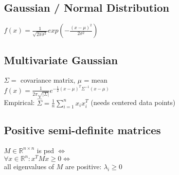 \subsection*{Gaussian / Normal Distribution}
$f(x) = \frac{1}{\sqrt{2\pi\sigma^2}} exp(-\frac{(x-\mu)^2}{2\sigma^2})$

\subsection*{Multivariate Gaussian}
$\Sigma =$ covariance matrix, $\mu$ = mean\\
$f(x) = \frac{1}{2\pi \sqrt{|\Sigma|}} e^{- \frac{1}{2} (x-\mu)^T \Sigma^{-1} (x-\mu)}$\\
Empirical: $\hat{\Sigma} = \frac{1}{n}\sum_{i=1}^n x_i x_i^T$ (needs centered data points)

\subsection*{Positive semi-definite matrices}
$M \in \mathbb{R}^{n\times n}$ is psd $\Leftrightarrow$\\
$\forall x \in \mathbb{R}^n: x^TMx \geq 0 \Leftrightarrow$\\
all eigenvalues of $M$ are positive: $\lambda_i\geq 0$
